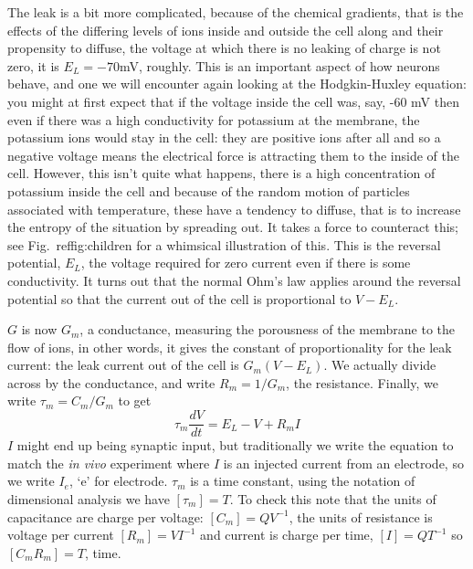 \documentclass{article}
\begin{document}
The leak is a bit more complicated, because of the chemical gradients,
that is the effects of the differing levels of ions inside and outside
the cell along and their propensity to diffuse, the voltage at which
there is no leaking of charge is not zero, it is $E_L=-70 $mV,
roughly. This is an important aspect of how neurons behave, and one we
will encounter again looking at the Hodgkin-Huxley equation: you might
at first expect that if the voltage inside the cell was, say, -60 mV
then even if there was a high conductivity for potassium at the
membrane, the potassium ions would stay in the cell: they are positive
ions after all and so a negative voltage means the electrical force is
attracting them to the inside of the cell. However, this isn't quite
what happens, there is a high concentration of potassium inside the
cell and because of the random motion of particles associated with
temperature, these have a tendency to diffuse, that is to increase the
entropy of the situation by spreading out. It takes a force to
counteract this; see Fig.~ref{fig:children} for a whimsical illustration of this. This is the reversal potential, $E_L$, the voltage
required for zero current even if there is some conductivity. It turns
out that the normal Ohm's law applies around the reversal potential so
that the current out of the cell is proportional to $V-E_L$.

$G$ is now $G_m$, a conductance, measuring the porousness of the
membrane to the flow of ions, in other words, it gives the constant of proportionality for the leak current: the leak current out of the cell is
$G_m(V-E_L)$. We actually divide across by the conductance, and write
$R_m=1/G_m$, the resistance. Finally, we write $\tau_m=C_m/G_m$ to get
\begin{equation}
\tau_m\frac{dV}{dt}=E_L-V+R_mI
\end{equation}
$I$ might end up being synaptic input, but traditionally we write the
equation to match the \textsl{in vivo} experiment where $I$ is an
injected current from an electrode, so we write $I_e$, \lq{}e\rq{} for
electrode. $\tau_m$ is a time constant, using the notation of
dimensional analysis we have $[\tau_m]=T$. To check this note that the
units of capacitance are charge per voltage: $[C_m]=QV^{-1}$, the
units of resistance is voltage per current $[R_m]=VI^{-1}$ and current
is charge per time, $[I]=QT^{-1}$ so $[C_mR_m]=T$, time.
\end{document}
